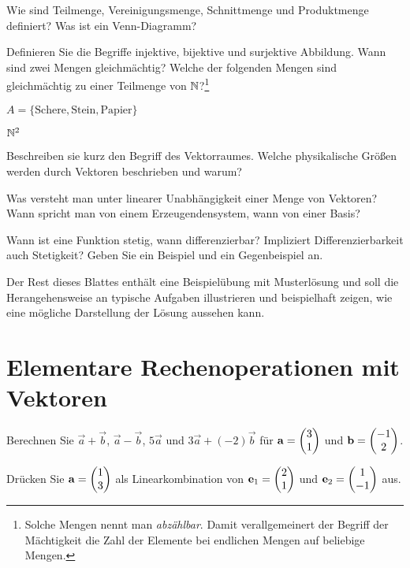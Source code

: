 \documentclass[11pt]{scrartcl}
\begin{document}
\begin{description}[leftmargin=1cm,labelindent=1cm]
  \item[Mengen] Wie sind Teilmenge, Vereinigungsmenge, Schnittmenge und Produktmenge definiert?
  Was ist ein Venn-Diagramm?
  \item[Abbildungen] Definieren Sie die Begriffe injektive, bijektive und surjektive Abbildung. 
  Wann sind zwei Mengen gleichmächtig?
  Welche der folgenden Mengen sind gleichmächtig zu einer Teilmenge von $\mathbb{N}$?\footnote{%
    Solche Mengen nennt man \emph{abzählbar}.
    Damit verallgemeinert der Begriff der Mächtigkeit die Zahl der Elemente bei endlichen Mengen auf beliebige Mengen.
  } 
  \begin{subex*}
    \item $A = \{ \mathrm{Schere}, \mathrm{Stein}, \mathrm{Papier} \}$
    \item $\mathbb{N}^2$
  \end{subex*}  

  \item[Vektorraum] Beschreiben sie kurz den Begriff des Vektorraumes. 
  Welche physikalische Größen werden durch Vektoren beschrieben und warum?
  \item[Lineare Unabhängigkeit] Was versteht man unter linearer Unabhängigkeit einer Menge von Vektoren? 
  Wann spricht man von einem Erzeugendensystem, wann von einer Basis? 
  \item[Stetigkeit und Differenzierbarkeit] Wann ist eine Funktion stetig, wann differenzierbar? 
  Impliziert Differenzierbarkeit auch Stetigkeit? 
  Geben Sie ein Beispiel und ein Gegenbeispiel an.
\end{description}

\sepline[.75\textwidth]

Der Rest dieses Blattes enthält eine Beispielübung mit Musterlösung und soll die Herangehensweise an typische Aufgaben illustrieren und beispielhaft zeigen, wie eine mögliche Darstellung der Lösung aussehen kann. 

\section{Elementare Rechenoperationen mit Vektoren}
\begin{subex}
  \item Berechnen Sie $\vec{a} + \vec{b}$, $\vec{a} - \vec{b}$, $5 \vec{a}$ und $3 \vec{a} + (-2) \vec{b}$ für $\mathbf{a} = \begin{pmatrix}3 \\ 1\end{pmatrix}$ und $\mathbf{b} = \begin{pmatrix} -1 \\ 2 \end{pmatrix}$.
  \item Drücken Sie $\mathbf{a} = \begin{pmatrix} 1 \\ 3 \end{pmatrix}$ als Linearkombination von $\mathbf{e}_1 = \begin{pmatrix} 2 \\ 1 \end{pmatrix}$ und $\mathbf{e}_2 = \begin{pmatrix} 1 \\ -1 \end{pmatrix}$ aus.
\end{subex}
\end{document}
